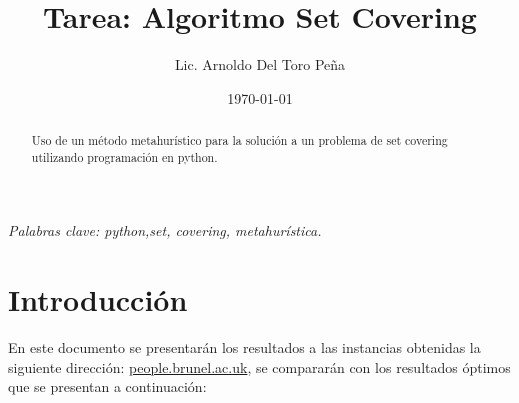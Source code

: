 \documentclass[12pt,a4paper]{article}
\author{Lic. Arnoldo Del Toro Peña}
\title{Tarea: Algoritmo Set Covering}
\date{\today}
\begin{document}
\maketitle



\thispagestyle{empty}
\begin{abstract}
    Uso de un método metahurístico para la solución a un problema de set covering utilizando programación en python.
\end{abstract}
{\centering \textit{Palabras clave: python,set, covering, metahurística.}}
\section{Introducción}
En este documento se presentarán los resultados a las instancias obtenidas la siguiente dirección: \href{http://people.brunel.ac.uk/~mastjjb/jeb/orlib/files/}{people.brunel.ac.uk}, se compararán con los resultados óptimos que se presentan a continuación:
\end{document}
